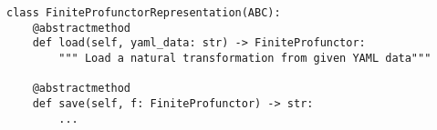 \par\begin{minipage}{65ex}
\begin{verbatim}
class FiniteProfunctorRepresentation(ABC):
    @abstractmethod
    def load(self, yaml_data: str) -> FiniteProfunctor:
        """ Load a natural transformation from given YAML data"""

    @abstractmethod
    def save(self, f: FiniteProfunctor) -> str:
        ...
\end{verbatim}
\end{minipage}\par